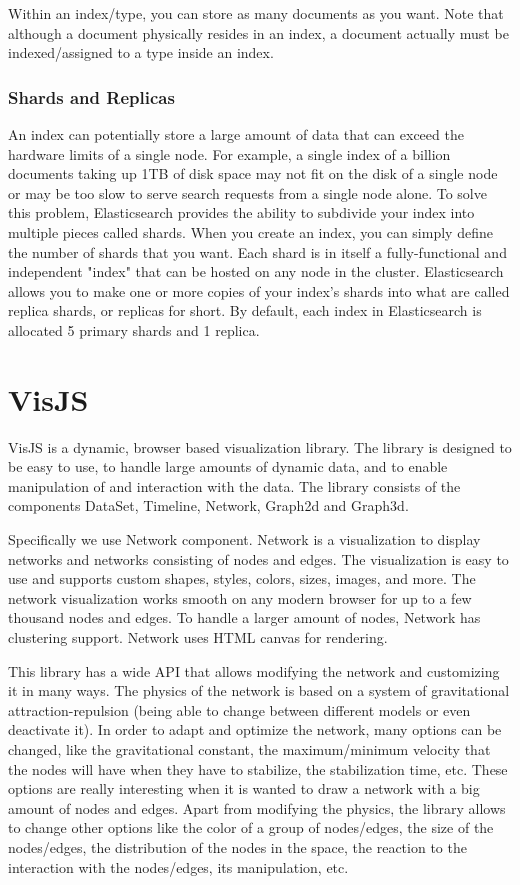 \documentclass[a4paper, 12pt]{book}
\begin{document}
Within an index/type, you can store as many documents as you want. Note that although a document physically resides in an index, a document actually must be indexed/assigned to a type inside an index.

\subsubsection{Shards and Replicas}
An index can potentially store a large amount of data that can exceed the hardware limits of a single node. For example, a single index of a billion documents taking up 1TB of disk space may not fit on the disk of a single node or may be too slow to serve search requests from a single node alone. To solve this problem, Elasticsearch provides the ability to subdivide your index into multiple pieces called shards. When you create an index, you can simply define the number of shards that you want. Each shard is in itself a fully-functional and independent "index" that can be hosted on any node in the cluster.
Elasticsearch allows you to make one or more copies of your index’s shards into what are called replica shards, or replicas for short. By default, each index in Elasticsearch is allocated 5 primary shards and 1 replica.

\section{VisJS}
\label{sec:visjs}
VisJS is a dynamic, browser based visualization library. The library is designed to be easy to use, to handle large amounts of dynamic data, and to enable manipulation of and interaction with the data. The library consists of the components DataSet, Timeline, Network, Graph2d and Graph3d.

Specifically we use Network component. Network is a visualization to display networks and networks consisting of nodes and edges. The visualization is easy to use and supports custom shapes, styles, colors, sizes, images, and more. The network visualization works smooth on any modern browser for up to a few thousand nodes and edges. To handle a larger amount of nodes, Network has clustering support. Network uses HTML canvas for rendering.

This library has a wide API that allows modifying the network and customizing it in many ways. The physics of the network is based on a system of gravitational attraction-repulsion (being able to change between different models or even deactivate it). In order to adapt and optimize the network, many options can be changed, like the gravitational constant, the maximum/minimum velocity that the nodes will have when they have to stabilize, the stabilization time, etc. These options are really interesting when it is wanted to draw a network with a big amount of nodes and edges. Apart from modifying the physics, the library allows to change other options like the color of a group of nodes/edges, the size of the nodes/edges, the distribution of the nodes in the space, the reaction to the interaction with the nodes/edges, its manipulation, etc.
\end{document}
